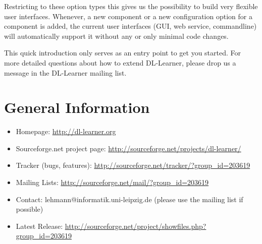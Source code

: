 \documentclass[a4paper,12pt]{scrartcl}
\begin{document}
Restricting to these option types this gives us the possibility to build very flexible user interfaces. Whenever, a new component or a new configuration option for a component is added, the current user interfaces (GUI, web service, commandline) will automatically support it without any or only minimal code changes.

This quick introduction only serves as an entry point to get you started. For more detailed questions about how to extend DL-Learner, please drop us a message in the DL-Learner mailing list.

\section{General Information}
\label{sec:general}
\label{sec:contact}

\begin{itemize}
 \item Homepage: \url{http://dl-learner.org}
 \item Sourceforge.net project page: \url{http://sourceforge.net/projects/dl-learner/}
 \item Tracker (bugs, features): \url{http://sourceforge.net/tracker/?group_id=203619}
 \item Mailing Lists: \url{http://sourceforge.net/mail/?group_id=203619}
 \item Contact: lehmann@informatik.uni-leipzig.de (please use the mailing list if possible)
 \item Latest Release: \url{http://sourceforge.net/project/showfiles.php?group_id=203619}
\end{itemize}



\end{document}
